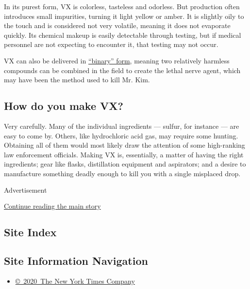 In its purest form, VX is colorless, tasteless and odorless. But
production often introduces small impurities, turning it light yellow or
amber. It is slightly oily to the touch and is considered not very
volatile, meaning it does not evaporate quickly. Its chemical makeup is
easily detectable through testing, but if medical personnel are not
expecting to encounter it, that testing may not occur.

VX can also be delivered in
\href{https://www.opcw.org/about-chemical-weapons/types-of-chemical-agent/nerve-agents/\#c4114}{``binary''
form}, meaning two relatively harmless compounds can be combined in the
field to create the lethal nerve agent, which may have been the method
used to kill Mr. Kim.

\hypertarget{how-do-you-make-vx}{%
\subsection{How do you make VX?}\label{how-do-you-make-vx}}

Very carefully. Many of the individual ingredients --- sulfur, for
instance --- are easy to come by. Others, like hydrochloric acid gas,
may require some hunting. Obtaining all of them would most likely draw
the attention of some high-ranking law enforcement officials. Making VX
is, essentially, a matter of having the right ingredients; gear like
flasks, distillation equipment and aspirators; and a desire to
manufacture something deadly enough to kill you with a single misplaced
drop.

Advertisement

\protect\hyperlink{after-bottom}{Continue reading the main story}

\hypertarget{site-index}{%
\subsection{Site Index}\label{site-index}}

\hypertarget{site-information-navigation}{%
\subsection{Site Information
Navigation}\label{site-information-navigation}}

\begin{itemize}
\tightlist
\item
  \href{https://help.nytimes.com/hc/en-us/articles/115014792127-Copyright-notice}{©~2020~The
  New York Times Company}
\end{itemize}

